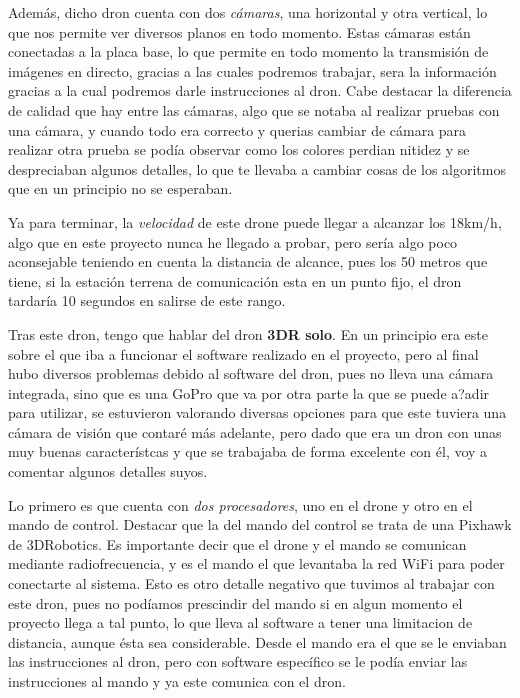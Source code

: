 \hspace{1 cm} Adem\'as, dicho dron cuenta con dos \textsl{c\'amaras}, una horizontal y otra vertical, lo que nos permite ver diversos planos en todo momento. Estas c\'amaras est\'an conectadas a la placa base, lo que permite en todo momento la transmisi\'on de im\'agenes en directo, gracias a las cuales podremos trabajar, sera la informaci\'on gracias a la cual podremos darle instrucciones al dron. Cabe destacar la diferencia de calidad que hay entre las c\'amaras, algo que se notaba al realizar pruebas con una c\'amara, y cuando todo era correcto y querias cambiar de c\'amara para realizar otra prueba se pod\'ia observar como los colores perdian nitidez y se despreciaban algunos detalles, lo que te llevaba a cambiar cosas de los algoritmos que en un principio no se esperaban. 

\hspace{1 cm} Ya para terminar, la \textsl{velocidad} de este drone puede llegar a alcanzar los 18km/h, algo que en este proyecto nunca he llegado a probar, pero ser\'ia algo poco aconsejable teniendo en cuenta la distancia de alcance, pues los 50 metros que tiene, si la estaci\'on terrena de comunicaci\'on esta en un punto fijo, el dron tardar\'ia 10 segundos en salirse de este rango. 


\hspace{1 cm} Tras este dron, tengo que hablar del dron \textbf{3DR solo}. En un principio era este sobre el que iba a funcionar el software realizado en el proyecto, pero al final hubo diversos problemas debido al software del dron, pues no lleva una c\'amara integrada, sino que es una GoPro que va por otra parte la que se puede a?adir para utilizar, se estuvieron valorando diversas opciones para que este tuviera una c\'amara de visi\'on que contar\'e m\'as adelante, pero dado que era un dron con unas muy buenas caracter\'istcas y que se trabajaba de forma excelente con \'el, voy a comentar algunos detalles suyos. 

\hspace{1 cm} Lo primero es que cuenta con \textsl{dos procesadores}, uno en el drone y otro en el mando de control. Destacar que la del mando del control se trata de una Pixhawk de 3DRobotics. Es importante decir que el drone y el mando se comunican mediante radiofrecuencia, y es el mando el que levantaba la red WiFi para poder conectarte al sistema. Esto es otro detalle negativo que tuvimos al trabajar con este dron, pues no pod\'iamos prescindir del mando si en algun momento el proyecto llega a tal punto, lo que lleva al software a tener una limitacion de distancia, aunque \'esta sea considerable. Desde el mando era el que se le enviaban las instrucciones al dron, pero con software espec\'ifico se le pod\'ia enviar las instrucciones al mando y ya este comunica con el dron. 

